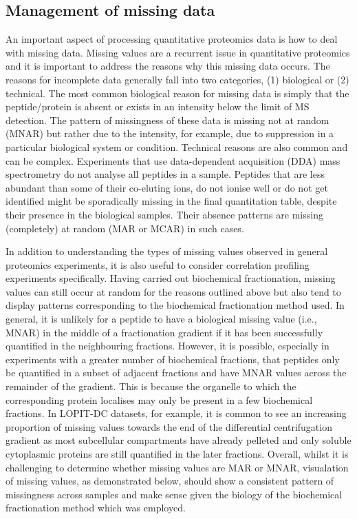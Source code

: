 \documentclass[9pt,a4paper,]{extarticle}
\begin{document}
\subsection{Management of missing data}\label{management-of-missing-data}

An important aspect of processing quantitative proteomics data is how to deal
with missing data. Missing values are a recurrent issue in quantitative proteomics
and it is important to address the reasons why this missing data occurs. The
reasons for incomplete data generally fall into two categories, (1) biological or
(2) technical. The most common biological reason for missing data is simply that
the peptide/protein is absent or exists in an intensity below the limit of MS
detection. The pattern of missingness of these data is missing not at random (MNAR)
but rather due to the intensity, for example, due to suppression in a particular
biological system or condition. Technical reasons are also common and can be complex.
Experiments that use data-dependent acquisition (DDA) mass spectrometry do not
analyse all peptides in a sample. Peptides that are less abundant than some of
their co-eluting ions, do not ionise well or do not get identified might be
sporadically missing in the final quantitation table, despite their presence in
the biological samples. Their absence patterns are missing (completely) at random
(MAR or MCAR) in such cases.

In addition to understanding the types of missing values observed in general
proteomics experiments, it is also useful to consider correlation profiling
experiments specifically. Having carried out biochemical fractionation, missing
values can still occur at random for the reasons outlined above but also tend
to display patterns corresponding to the biochemical fractionation method used.
In general, it is unlikely for a peptide to have a biological missing value
(i.e., MNAR) in the middle of a fractionation gradient if it has been successfully
quantified in the neighbouring fractions. However, it is possible, especially
in experiments with a greater number of biochemical fractions, that peptides only
be quantified in a subset of adjacent fractions and have MNAR values across the
remainder of the gradient. This is because the organelle to which the corresponding
protein localises may only be present in a few biochemical fractions. In LOPIT-DC
datasets, for example, it is common to see an increasing proportion of missing
values towards the end of the differential centrifugation gradient as most
subcellular compartments have already pelleted and only soluble cytoplasmic
proteins are still quantified in the later fractions. Overall, whilst it is
challenging to determine whether missing values are MAR or MNAR, visualation of
missing values, as demonstrated below, should show a consistent pattern
of missingness across samples and make sense given the biology of the biochemical
fractionation method which was employed.
\end{document}
